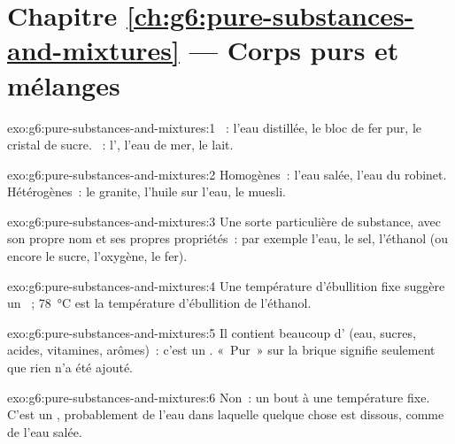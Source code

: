 \section*{Chapitre \ref{ch:g6:pure-substances-and-mixtures} --- Corps purs et mélanges}

\begin{solution}{exo:g6:pure-substances-and-mixtures:1}
~: l'eau distillée, le bloc de fer pur, le cristal de sucre.
~: l', l'eau de mer, le lait.
\end{solution}

\begin{solution}{exo:g6:pure-substances-and-mixtures:2}
Homogènes~: l'eau salée, l'eau du robinet. Hétérogènes~: le granite,
l'huile sur l'eau, le muesli.
\end{solution}

\begin{solution}{exo:g6:pure-substances-and-mixtures:3}
Une sorte particulière de substance, avec son propre nom et ses propres
propriétés~: par exemple l'eau, le sel, l'éthanol (ou encore le sucre,
l'oxygène, le fer).
\end{solution}

\begin{solution}{exo:g6:pure-substances-and-mixtures:4}
Une température d'ébullition fixe suggère un ~;
\qty{78}{\celsius} est la température d'ébullition de l'éthanol.
\end{solution}

\begin{solution}{exo:g6:pure-substances-and-mixtures:5}
Il contient beaucoup d' (eau, sucres, acides,
vitamines, arômes)~: c'est un . «~Pur~» sur la brique signifie
seulement que rien n'a été ajouté.
\end{solution}

\begin{solution}{exo:g6:pure-substances-and-mixtures:6}
Non~: un  bout à une température fixe. C'est un ,
probablement de l'eau dans laquelle quelque chose est dissous, comme de
l'eau salée.
\end{solution}

